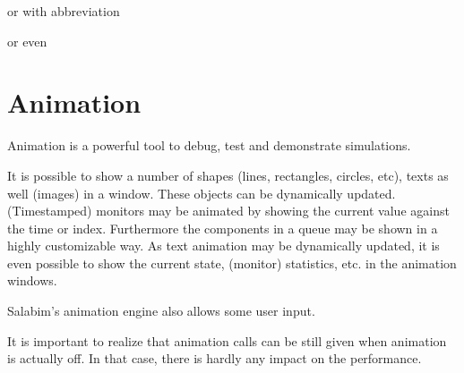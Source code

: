 \documentclass[letterpaper,10pt,english]{sphinxmanual}
\begin{document}
\begin{sphinxVerbatim}[commandchars=\\\{\}]
\end{sphinxVerbatim}

or with abbreviation

\begin{sphinxVerbatim}[commandchars=\\\{\}]
\end{sphinxVerbatim}

or even

\begin{sphinxVerbatim}[commandchars=\\\{\}]
\end{sphinxVerbatim}


\chapter{Animation}
\label{\detokenize{Animation:animation}}\label{\detokenize{Animation::doc}}
Animation is a powerful tool to debug, test and demonstrate simulations.

It is possible to show a number of shapes (lines, rectangles, circles, etc), texts as well (images) in a window. These objects can be dynamically updated.
(Timestamped) monitors may be animated by showing the current value against the time or index.
Furthermore the components in a queue may be shown in a highly customizable way.
As text animation may be dynamically updated, it is even possible to show the current state, (monitor) statistics, etc. in the animation windows.

Salabim’s animation engine also allows some user input.

It is important to realize that animation calls can be still given when animation is actually off. In that case, there is hardly any impact on the performance.
\end{document}
